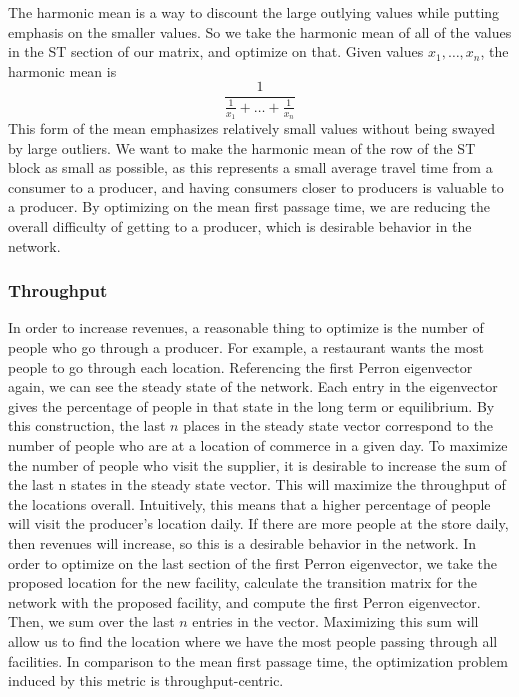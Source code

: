 \documentclass[twoside,twocolumn]{article}
\begin{document}
The harmonic mean is a way to discount the large outlying values while putting emphasis on the smaller values.
So we take the harmonic mean of all of the values in the ST section of our matrix, and optimize on that.
Given values $x_{1}, \hdots, x_{n}$, the harmonic mean is 
$$\frac{1}{\frac{1}{x_{1}} + \hdots + \frac{1}{x_{n}}}$$
This form of the mean emphasizes relatively small values without being swayed by large outliers.
We want to make the harmonic mean of the row of the ST block as small as possible, as this represents a small average travel time from a consumer to a producer, and having consumers closer to producers is valuable to a producer.
By optimizing on the mean first passage time, we are reducing the overall difficulty of getting to a producer, which is desirable behavior in the network.


\subsubsection{Throughput}
In order to increase revenues, a reasonable thing to optimize is the number of people who go through a producer.
For example, a restaurant wants the most people to go through each location.
Referencing the first Perron eigenvector again, we can see the steady state of the network. %
Each entry in the eigenvector gives the percentage of people in that state in the long term or equilibrium. %
By this construction, the last $n$ places in the steady state vector correspond to the number of people who are at a location of commerce in a given day.
To maximize the number of people who visit the supplier, it is desirable to increase the sum of the last n states in the steady state vector.
This will maximize the throughput of the locations overall.
Intuitively, this means that a higher percentage of people will visit the producer's location daily.
If there are more people at the store daily, then revenues will increase, so this is a desirable behavior in the network.
In order to optimize on the last section of the first Perron eigenvector, we take the proposed location for the new facility, calculate the transition matrix for the network with the proposed facility, and compute the first Perron eigenvector.
Then, we sum over the last $n$ entries in the vector.
Maximizing this sum will allow us to find the location where we have the most people passing through all facilities.
In comparison to the mean first passage time, the optimization problem induced by this metric is throughput-centric.
\end{document}
